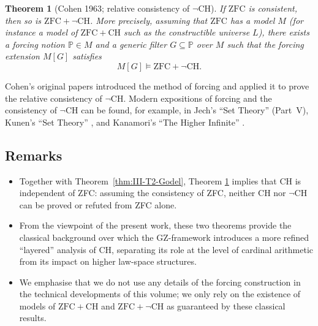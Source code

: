 \documentclass[11pt]{book}
\theoremstyle{plain}
\newtheorem{theorem}{Theorem}[chapter]      \newtheorem{proposition}[theorem]{Proposition} \newtheorem{lemma}[theorem]{Lemma}          \newtheorem{corollary}[theorem]{Corollary}
\theoremstyle{definition}
\begin{document}
\begin{theorem}[Cohen 1963; relative consistency of $\neg\mathrm{CH}$]
\label{thm:III-T3-Cohen}
If \(\mathrm{ZFC}\) is consistent, then so is
\(\mathrm{ZFC} + \neg\mathrm{CH}\).  More precisely, assuming that
\(\mathrm{ZFC}\) has a model \(M\) (for instance a model of
\(\mathrm{ZFC}+\mathrm{CH}\) such as the constructible universe \(L\)),
there exists a forcing notion \(\mathbb{P}\in M\) and a generic filter
\(G\subseteq\mathbb{P}\) over \(M\) such that the forcing extension
\(M[G]\) satisfies
\[
  M[G]\models \mathrm{ZFC} + \neg\mathrm{CH}.
\]
\end{theorem}

Cohen’s original papers \cite{Cohen1963} introduced the method of
forcing and applied it to prove the relative consistency of
\(\neg\mathrm{CH}\).  Modern expositions of forcing and the consistency
of \(\neg\mathrm{CH}\) can be found, for example, in Jech’s “Set
Theory” \cite{Jech2003} (Part~V), Kunen’s “Set Theory”
\cite{Kunen2011}, and Kanamori’s “The Higher Infinite”
\cite{Kanamori2003}.



\subsection*{Remarks}


\begin{itemize}
  \item Together with Theorem~\ref{thm:III-T2-Godel}, Theorem
        \ref{thm:III-T3-Cohen} implies that CH is independent of ZFC:
        assuming the consistency of ZFC, neither CH nor \(\neg\mathrm{CH}\)
        can be proved or refuted from ZFC alone.
  \item From the viewpoint of the present work, these two theorems
        provide the classical background over which the GZ-framework
        introduces a more refined “layered” analysis of CH, separating
        its role at the level of cardinal arithmetic from its impact
        on higher law-space structures.
  \item We emphasise that we do not use any details of the forcing
        construction in the technical developments of this volume; we
        only rely on the existence of models of
        \(\mathrm{ZFC}+\mathrm{CH}\) and
        \(\mathrm{ZFC}+\neg\mathrm{CH}\) as guaranteed by these
        classical results.
\end{itemize}
\end{document}
